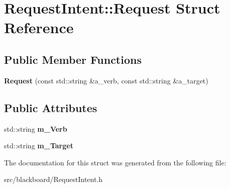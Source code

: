 \hypertarget{struct_request_intent_1_1_request}{}\section{Request\+Intent\+:\+:Request Struct Reference}
\label{struct_request_intent_1_1_request}
\subsection*{Public Member Functions}
\begin{DoxyCompactItemize}
\item 
\mbox{\label{struct_request_intent_1_1_request_ad189dd6c5cd934bb2e5a662519dd89f0}} 
{\bfseries Request} (const std\+::string \&a\+\_\+verb, const std\+::string \&a\+\_\+target)
\end{DoxyCompactItemize}
\subsection*{Public Attributes}
\begin{DoxyCompactItemize}
\item 
\mbox{\label{struct_request_intent_1_1_request_a9a414b05661195d56a2003254ada2c9f}} 
std\+::string {\bfseries m\+\_\+\+Verb}
\item 
\mbox{\label{struct_request_intent_1_1_request_aae2f8847a86351315d7bcb5787c6cf5d}} 
std\+::string {\bfseries m\+\_\+\+Target}
\end{DoxyCompactItemize}


The documentation for this struct was generated from the following file\+:\begin{DoxyCompactItemize}
\item 
src/blackboard/Request\+Intent.\+h\end{DoxyCompactItemize}
